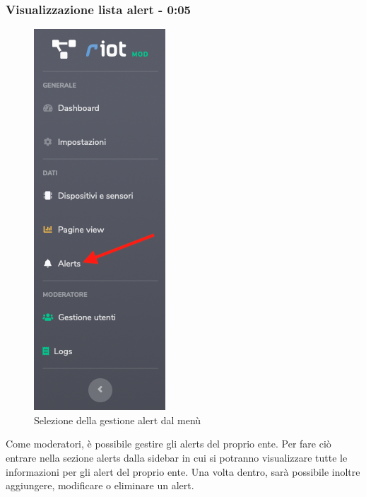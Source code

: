 	\subsubsection{Visualizzazione lista alert - 0:05}
		\begin{figure}[H]
		\centering
		\includegraphics[scale=0.600]{res/images/mod/menuAlert.png}
		\caption{Selezione della gestione alert dal menù}
	\end{figure}
	Come moderatori, è possibile gestire gli alerts del proprio ente.
	Per fare ciò entrare nella sezione alerts dalla sidebar in cui si potranno visualizzare tutte le informazioni per gli alert del proprio ente. 
	Una volta dentro, sarà possibile inoltre aggiungere, modificare o eliminare un alert.

